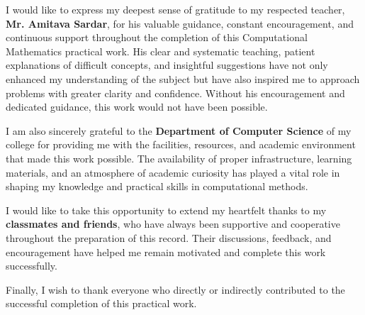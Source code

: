 I would like to express my deepest sense of gratitude to my respected teacher, 
\textbf{Mr. Amitava Sardar}, for his valuable guidance, constant encouragement, 
and continuous support throughout the completion of this Computational Mathematics 
practical work. His clear and systematic teaching, patient explanations of difficult 
concepts, and insightful suggestions have not only enhanced my understanding of the 
subject but have also inspired me to approach problems with greater clarity and confidence.  
Without his encouragement and dedicated guidance, this work would not have been possible.  

I am also sincerely grateful to the \textbf{Department of Computer Science} of my 
college for providing me with the facilities, resources, and academic environment 
that made this work possible. The availability of proper infrastructure, learning 
materials, and an atmosphere of academic curiosity has played a vital role in 
shaping my knowledge and practical skills in computational methods.  

I would like to take this opportunity to extend my heartfelt thanks to my 
\textbf{classmates and friends}, who have always been supportive and cooperative 
throughout the preparation of this record. Their discussions, feedback, and 
encouragement have helped me remain motivated and complete this work successfully.  

Finally, I wish to thank everyone who directly or indirectly contributed to the 
successful completion of this practical work. 